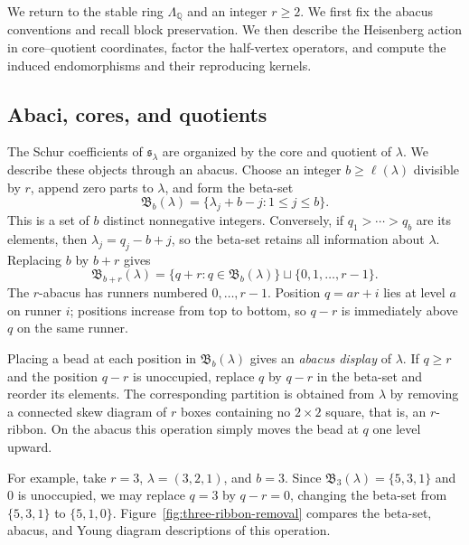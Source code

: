 \documentclass[12pt,reqno,a4paper]{amsart}
\numberwithin{equation}{section}
\numberwithin{figure}{section}
\theoremstyle{plain}
\theoremstyle{definition}
\begin{document}
We return to the stable ring $\Lambda_{\mathbb Q}$ and an integer
$r\geq2$.  We first fix the abacus conventions and recall
block preservation.  We then describe the Heisenberg action in
core--quotient coordinates, factor the half-vertex operators, and
compute the induced endomorphisms and their reproducing kernels.

\subsection{Abaci, cores, and quotients}
\label{subsec:abacus-core-quotient}

The Schur coefficients of $\mathfrak{s}_\lambda$ are organized by the core and
quotient of $\lambda$.  We describe these objects through an abacus.
Choose an integer $b\geq\ell(\lambda)$ divisible by $r$, append zero
parts to $\lambda$, and form the beta-set
\[
\mathfrak B_b(\lambda)=\{\lambda_j+b-j:1\leq j\leq b\}.
\]
This is a set of $b$ distinct nonnegative integers.  Conversely, if
$q_1>\cdots>q_b$ are its elements, then
$\lambda_j=q_j-b+j$, so the beta-set retains all information about
$\lambda$.  Replacing $b$ by $b+r$ gives
\begin{equation}\label{eq:beta-set-b-plus-r}
\mathfrak B_{b+r}(\lambda)
=\{q+r:q\in \mathfrak B_b(\lambda)\}\sqcup\{0,1,\ldots,r-1\}.
\end{equation}
The $r$-abacus has runners numbered $0,\ldots,r-1$.  Position
$q=ar+i$ lies at level $a$ on runner $i$; positions increase from top
to bottom, so $q-r$ is immediately above $q$ on the same runner.

Placing a bead at each position in $\mathfrak B_b(\lambda)$ gives an
\emph{abacus display} of $\lambda$.  If $q\geq r$ and
the position $q-r$ is unoccupied, replace $q$ by $q-r$ in the beta-set
and reorder its elements.  The corresponding partition is obtained from
$\lambda$ by removing a connected skew diagram of $r$ boxes containing no
$2\times2$ square, that is, an $r$-ribbon.  On the abacus this operation
simply moves the bead at $q$ one level upward.

For example, take $r=3$, $\lambda=(3,2,1)$, and $b=3$.  Since
$\mathfrak B_3(\lambda)=\{5,3,1\}$ and $0$ is unoccupied, we may replace
$q=3$ by $q-r=0$, changing the beta-set from $\{5,3,1\}$ to
$\{5,1,0\}$.  Figure~\ref{fig:three-ribbon-removal} compares the
beta-set, abacus, and Young diagram descriptions of this operation.
\end{document}
